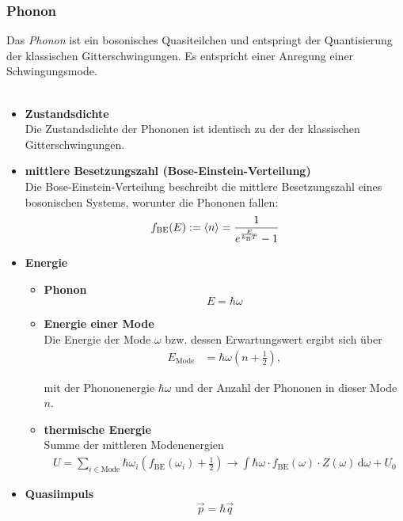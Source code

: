\documentclass{article}
\newcommand{\diff}{\mathrm{d}}
\newcommand{\lr}[1]{\left(#1\right)}
\begin{document}
\subsubsection{Phonon}
Das \textit{Phonon} ist ein bosonisches Quasiteilchen und entspringt der Quantisierung der klassischen Gitterschwingungen. Es entspricht einer Anregung einer Schwingungsmode.\\
\\
	\begin{itemize}
		\item \textbf{Zustandsdichte}\\
		Die Zustandsdichte der Phononen ist identisch zu der der klassischen Gitterschwingungen.
		
		
		\item \textbf{mittlere Besetzungszahl (Bose-Einstein-Verteilung)}\\
		Die Bose-Einstein-Verteilung beschreibt die mittlere Besetzungszahl eines bosonischen Systems, worunter die Phononen fallen:
			\begin{equation}
				f_\text{BE}(E) := \braket{n} = \frac{1}{e^{\frac{E}{k_\text{B}T}} - 1}
			\end{equation}
		
		
		\item \textbf{Energie}
			\begin{itemize}
				\item \textbf{Phonon}
					\begin{equation}
						E = \hbar\omega
					\end{equation}
				
				
				\item \textbf{Energie einer Mode}\\
				Die Energie der Mode $\omega$ bzw. dessen Erwartungswert ergibt sich über
					\begin{align}
						E_\text{Mode} &= \hbar \omega \lr{ n + \frac{1}{2} },
					\end{align}
				
				mit der Phononenergie $\hbar\omega$ und der Anzahl der Phononen in dieser Mode $n$.
				
				
				\item \textbf{thermische Energie}\\
				Summe der mittleren Modenenergien
					\begin{align}
						U = \sum_{i \in \text{Mode}} \hbar\omega_i \lr{ f_\text{BE}(\omega_i) + \frac{1}{2} } \to \int  \hbar\omega \cdot f_\text{BE}(\omega) \cdot Z(\omega)  \, \diff \omega + U_0
					\end{align}
			\end{itemize}


		\item \textbf{Quasiimpuls}
			\begin{equation}
				\vec{p} = \hbar \vec{q}
			\end{equation}
	\end{itemize}
\end{document}
